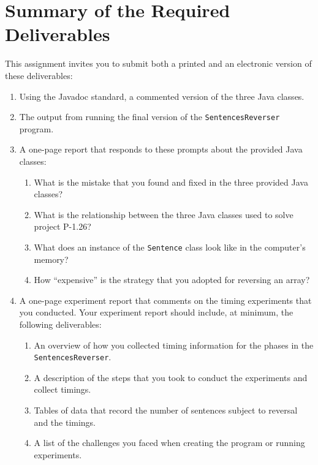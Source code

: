 \section*{Summary of the Required Deliverables}

This assignment invites you to submit both a printed and an electronic version of these deliverables:

\vspace*{-.05in}
\begin{enumerate}

  \itemsep 0em
  \item Using the Javadoc standard, a commented version of the three Java classes.

  \item The output from running the final version of the {\tt SentencesReverser} program.

  \item A one-page report that responds to these prompts about the provided Java classes:

    \vspace*{-.05in}
    \begin{enumerate}
      \itemsep 0em

      \item What is the mistake that you found and fixed in the three provided Java classes?

      \item What is the relationship between the three Java classes used to solve project P-1.26?

      \item What does an instance of the {\tt Sentence} class look like in the computer's memory?

      \item How ``expensive'' is the strategy that you adopted for reversing an array?

    \end{enumerate}

  \item A one-page experiment report that comments on the timing experiments that you conducted. Your experiment report
    should include, at minimum, the following deliverables:

    \vspace*{-.05in}
    \begin{enumerate}
      \itemsep 0em
      \item An overview of how you collected timing information for the phases in the {\tt  SentencesReverser}.
      \item A description of the steps that you took to conduct the experiments and collect timings.
      \item Tables of data that record the number of sentences subject to reversal and the timings.
      \item A list of the challenges you faced when creating the program or running experiments.
    \end{enumerate}

\end{enumerate}

